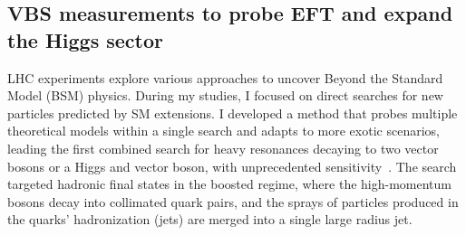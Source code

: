 {\begin{flushleft}
\vskip 10pt
\section{VBS measurements to probe EFT and expand the Higgs sector}
\vskip 5pt
LHC experiments explore various approaches to uncover Beyond the Standard Model (BSM) physics. During my studies, I focused on direct searches for new particles predicted by SM extensions. I developed a method that probes multiple theoretical models within a single search and adapts to more exotic scenarios, leading the first combined search for heavy resonances decaying to two vector bosons or a Higgs and vector boson, with unprecedented sensitivity~\cite{[1]}. The search targeted hadronic final states in the boosted regime, where the high-momentum bosons decay into collimated quark pairs, and the sprays of particles produced in the quarks' hadronization (jets) are merged into a single large radius jet.%


\end{flushleft}}
